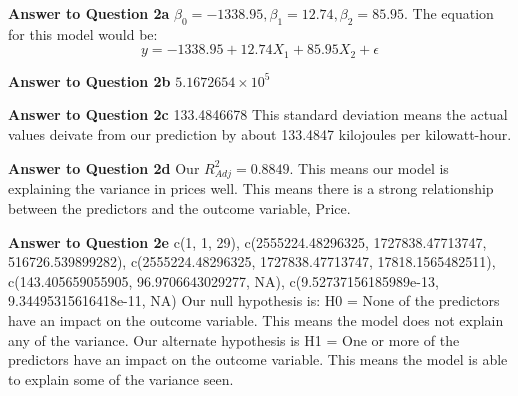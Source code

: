 \documentclass[
]{article}
\newenvironment{Shaded}{\begin{snugshade}}{\end{snugshade}}
\newcommand{\AttributeTok}[1]{\textcolor[rgb]{0.77,0.63,0.00}{#1}}
\newcommand{\CommentTok}[1]{\textcolor[rgb]{0.56,0.35,0.01}{\textit{#1}}}
\newcommand{\DecValTok}[1]{\textcolor[rgb]{0.00,0.00,0.81}{#1}}
\newcommand{\FunctionTok}[1]{\textcolor[rgb]{0.00,0.00,0.00}{#1}}
\newcommand{\NormalTok}[1]{#1}
\newcommand{\OtherTok}[1]{\textcolor[rgb]{0.56,0.35,0.01}{#1}}
\newcommand{\SpecialCharTok}[1]{\textcolor[rgb]{0.00,0.00,0.00}{#1}}
\newcommand{\StringTok}[1]{\textcolor[rgb]{0.31,0.60,0.02}{#1}}
\begin{document}
\begin{Shaded}
\end{Shaded}

\textbf{Answer to Question 2a}
\(\beta_0 = -1338.95, \beta_1 = 12.74, \beta_2 = 85.95\). The equation
for this model would be: \[ y = -1338.95+12.74X_1+85.95X_2+\epsilon\]

\textbf{Answer to Question 2b} \ensuremath{5.1672654\times 10^{5}}

\textbf{Answer to Question 2c} 133.4846678 This standard deviation means
the actual values deivate from our prediction by about 133.4847
kilojoules per kilowatt-hour.

\textbf{Answer to Question 2d} Our \(R^2_{Adj} = 0.8849\). This means
our model is explaining the variance in prices well. This means there is
a strong relationship between the predictors and the outcome variable,
Price.

\textbf{Answer to Question 2e} c(1, 1, 29), c(2555224.48296325,
1727838.47713747, 516726.539899282), c(2555224.48296325,
1727838.47713747, 17818.1565482511), c(143.405659055905,
96.9706643029277, NA), c(9.52737156185989e-13, 9.34495315616418e-11, NA)
Our null hypothesis is: H0 = None of the predictors have an impact on
the outcome variable. This means the model does not explain any of the
variance. Our alternate hypothesis is H1 = One or more of the predictors
have an impact on the outcome variable. This means the model is able to
explain some of the variance seen.
\end{document}
